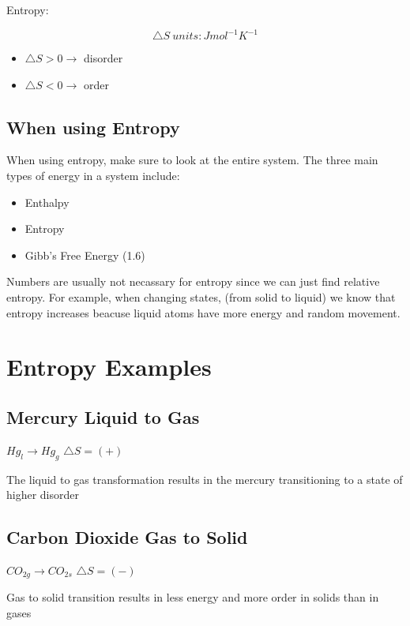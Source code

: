\documentclass[12pt]{article} %
\begin{document}
Entropy:

$$\triangle{S}\ units: Jmol^{-1}K^{-1}$$

\begin{itemize}
\item $\triangle{S} > 0 \rightarrow$ disorder
\item $\triangle{S} < 0 \rightarrow$ order
\end{itemize}

\subsection{When using Entropy}

When using entropy,  make sure to look at the entire system.  The three main types of energy in a system include:

\singlespace
\begin{itemize}
\item Enthalpy
\item Entropy
\item Gibb's Free Energy (1.6)
\end{itemize}
\doublespace

Numbers are usually not necassary for entropy since we can just find relative entropy.  For example, when changing states,  (from solid to liquid) we know that entropy increases beacuse liquid atoms have more energy and random movement.

\pagebreak

\section{Entropy Examples}

\subsection{Mercury Liquid to Gas}

$Hg_l \rightarrow Hg_g$
$\triangle{S} = (+)$

The liquid to gas transformation results in the mercury transitioning to a state of higher disorder

\subsection{Carbon Dioxide Gas to Solid}

$CO_{2g} \rightarrow CO_{2s}$
$\triangle{S} = (-)$

Gas to solid transition results in less energy and more order in solids than in gases
\end{document}
